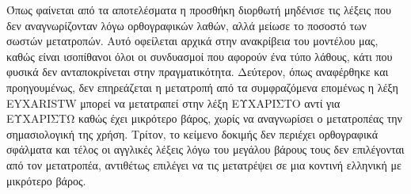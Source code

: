 \documentclass{article}
\begin{document}
Όπως φαίνεται από τα αποτελέσματα η προσθήκη διορθωτή μηδένισε τις λέξεις που δεν αναγνωρίζονταν λόγω ορθογραφικών λαθών, αλλά μείωσε το ποσοστό των σωστών μετατροπών. Αυτό οφείλεται αρχικά στην ανακρίβεια του μοντέλου μας, καθώς είναι ισοπίθανοι όλοι οι συνδυασμοί που αφορούν ένα τύπο λάθους, κάτι που φυσικά δεν ανταποκρίνεται στην πραγματικότητα. Δεύτερον, όπως αναφέρθηκε και προηγουμένως, δεν επηρεάζεται η μετατροπή από τα συμφραζόμενα επομένως η λέξη \textlatin{EYXARISTW} μπορεί να μετατραπεί στην λέξη ΕΥΧΑΡΙΣΤΟ αντί για ΕΥΧΑΡΙΣΤΩ καθώς έχει μικρότερο βάρος, χωρίς να αναγνωρίσει ο μετατροπέας την σημασιολογική της χρήση. Τρίτον, το κείμενο δοκιμής δεν περιέχει ορθογραφικά σφάλματα και τέλος οι αγγλικές λέξεις λόγω του μεγάλου βάρους τους δεν επιλέγονται από τον μετατροπέα, αντιθέτως επιλέγει να τις μετατρέψει σε μια κοντινή ελληνική με μικρότερο βάρος.
\end{document}
